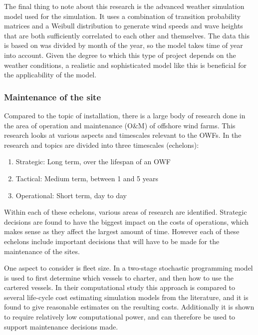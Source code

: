 \documentclass[a4paper,12pt]{article}
\begin{document}
The final thing to note about this research is the advanced weather simulation model used for the simulation. It uses a combination of transition probability matrices and a Weibull distribution to generate wind speeds and wave heights that are both sufficiently correlated to each other and themselves. The data this is based on was divided by month of the year, so the model takes time of year into account. Given the degree to which this type of project depends on the weather conditions, a realistic and sophisticated model like this is beneficial for the applicability of the model. 

\subsubsection{Maintenance of the site} \label{sss:maint}

Compared to the topic of installation, there is a large body of research done in the area of operation and maintenance (O\&M) of offshore wind farms. This research looks at various aspects and timescales relevant to the OWFs. In \cite{shafiee2015maintenance} the research and topics are divided into three timescales (echelons):

\begin{enumerate}
\item Strategic: Long term, over the lifespan of an OWF
\item Tactical: Medium term, between 1 and 5 years
\item Operational: Short term, day to day
\end{enumerate}

Within each of these echelons, various areas of research are identified. Strategic decisions are found to have the biggest impact on the costs of operations, which makes sense as they affect the largest amount of time. However each of these echelons include important decisions that will have to be made for the maintenance of the sites. 

One aspect to consider is fleet size. In \cite{staalhane2019optimizing} a two-stage stochastic programming model is used to first determine which vessels to charter, and then how to use the cartered vessels. In their computational study this approach is compared to several life-cycle cost estimating simulation models from the literature, and it is found to give reasonable estimates on the resulting costs. Additionally it is shown to require relatively low computational power, and can therefore be used to support maintenance decisions made. 
\end{document}
